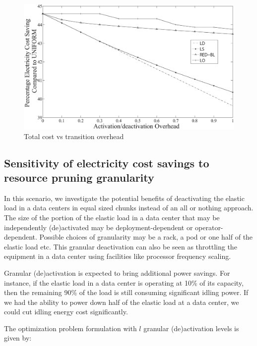 \begin{figure}[htbp]
    \centering
    \includegraphics[width=0.7\linewidth]{pics/s3r.eps}
    \caption{Total cost vs transition overhead}
    \label{fig:s3r}
\end{figure}

\subsection{Sensitivity of electricity cost savings to resource pruning granularity}
In this scenario, we investigate the potential benefits of deactivating the elastic load in a data centers in equal sized chunks instead of an all or nothing approach. The size of the portion of the elastic load in a data center that may be independently (de)activated may be deployment-dependent or operator-dependent. Possible choices of granularity may be a rack, a pod or one half of the elastic load etc. This granular deactivation can also be seen as throttling the equipment in a data center using facilities like processor frequency scaling. 

Granular (de)activation is expected to bring additional power savings. For instance, if the elastic load in a data center is operating at 10\% of its capacity, then the remaining 90\% of the load is still consuming significant idling power. If we had the ability to power down half of the elastic load at a data center, we could cut idling energy cost significantly. 

The optimization problem formulation with $l$ granular (de)activation levels is given by:
 
